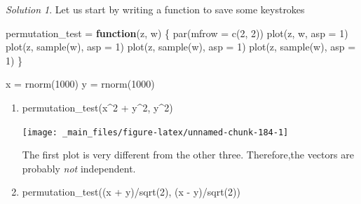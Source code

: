 \documentclass[
]{book}
\newenvironment{Shaded}{\begin{snugshade}}{\end{snugshade}}
\newcommand{\AttributeTok}[1]{\textcolor[rgb]{0.77,0.63,0.00}{#1}}
\newcommand{\ControlFlowTok}[1]{\textcolor[rgb]{0.13,0.29,0.53}{\textbf{#1}}}
\newcommand{\DecValTok}[1]{\textcolor[rgb]{0.00,0.00,0.81}{#1}}
\newcommand{\FunctionTok}[1]{\textcolor[rgb]{0.00,0.00,0.00}{#1}}
\newcommand{\NormalTok}[1]{#1}
\newcommand{\OtherTok}[1]{\textcolor[rgb]{0.56,0.35,0.01}{#1}}
\newcommand{\SpecialCharTok}[1]{\textcolor[rgb]{0.00,0.00,0.00}{#1}}
\theoremstyle{definition}
\theoremstyle{definition}
\theoremstyle{definition}
\theoremstyle{definition}
\theoremstyle{remark}
\newtheorem*{solution}{Solution}
\begin{document}
\begin{solution}
Let us start by writing a function to save some keystrokes

\begin{Shaded}
\begin{Highlighting}[]
\NormalTok{permutation\_test }\OtherTok{=} \ControlFlowTok{function}\NormalTok{(z, w) \{}
    \FunctionTok{par}\NormalTok{(}\AttributeTok{mfrow =} \FunctionTok{c}\NormalTok{(}\DecValTok{2}\NormalTok{, }\DecValTok{2}\NormalTok{))}
    \FunctionTok{plot}\NormalTok{(z, w, }\AttributeTok{asp =} \DecValTok{1}\NormalTok{)}
    \FunctionTok{plot}\NormalTok{(z, }\FunctionTok{sample}\NormalTok{(w), }\AttributeTok{asp =} \DecValTok{1}\NormalTok{)}
    \FunctionTok{plot}\NormalTok{(z, }\FunctionTok{sample}\NormalTok{(w), }\AttributeTok{asp =} \DecValTok{1}\NormalTok{)}
    \FunctionTok{plot}\NormalTok{(z, }\FunctionTok{sample}\NormalTok{(w), }\AttributeTok{asp =} \DecValTok{1}\NormalTok{)}
\NormalTok{\}}

\NormalTok{x }\OtherTok{=} \FunctionTok{rnorm}\NormalTok{(}\DecValTok{1000}\NormalTok{)}
\NormalTok{y }\OtherTok{=} \FunctionTok{rnorm}\NormalTok{(}\DecValTok{1000}\NormalTok{)}
\end{Highlighting}
\end{Shaded}

\begin{enumerate}
\def\labelenumi{\alph{enumi})}
\item
\begin{Shaded}
\begin{Highlighting}[]
\FunctionTok{permutation\_test}\NormalTok{(x}\SpecialCharTok{\^{}}\DecValTok{2} \SpecialCharTok{+}\NormalTok{ y}\SpecialCharTok{\^{}}\DecValTok{2}\NormalTok{, y}\SpecialCharTok{\^{}}\DecValTok{2}\NormalTok{)}
\end{Highlighting}
\end{Shaded}

  \begin{center}\texttt{[image: \_main\_files/figure-latex/unnamed-chunk-184-1]} \end{center}

  The first plot is very different from the other three. Therefore,the vectors are probably \emph{not} independent.
\item
\begin{Shaded}
\begin{Highlighting}[]
\FunctionTok{permutation\_test}\NormalTok{((x }\SpecialCharTok{+}\NormalTok{ y)}\SpecialCharTok{/}\FunctionTok{sqrt}\NormalTok{(}\DecValTok{2}\NormalTok{), (x }\SpecialCharTok{{-}}\NormalTok{ y)}\SpecialCharTok{/}\FunctionTok{sqrt}\NormalTok{(}\DecValTok{2}\NormalTok{))}
\end{Highlighting}
\end{Shaded}


\end{enumerate}
\end{solution}
\end{document}
